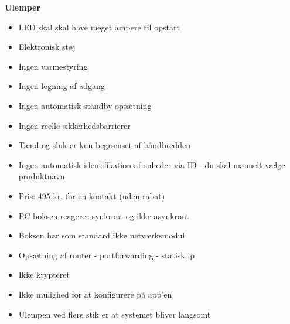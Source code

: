 {\bf Ulemper}
\begin{itemize}
    \item LED skal skal have meget ampere til opstart
    \item Elektronisk støj
    \item Ingen varmestyring
    \item Ingen logning af adgang
    \item Ingen automatisk standby opsætning
    \item Ingen reelle sikkerhedsbarrierer
    \item Tænd og sluk er kun begrænset af båndbredden
    \item Ingen automatisk identifikation af enheder via ID - du skal manuelt vælge produktnavn
    \item Pris: 495 kr. for en kontakt     (uden rabat)
    \item PC boksen reagerer synkront og ikke asynkront
    \item Boksen har som standard ikke netværksmodul
    \item Opsætning af router - portforwarding - statisk ip
    \item Ikke krypteret
    \item Ikke mulighed for at konfigurere på app’en
    \item Ulempen ved flere stik er at systemet bliver langsomt
\end{itemize}